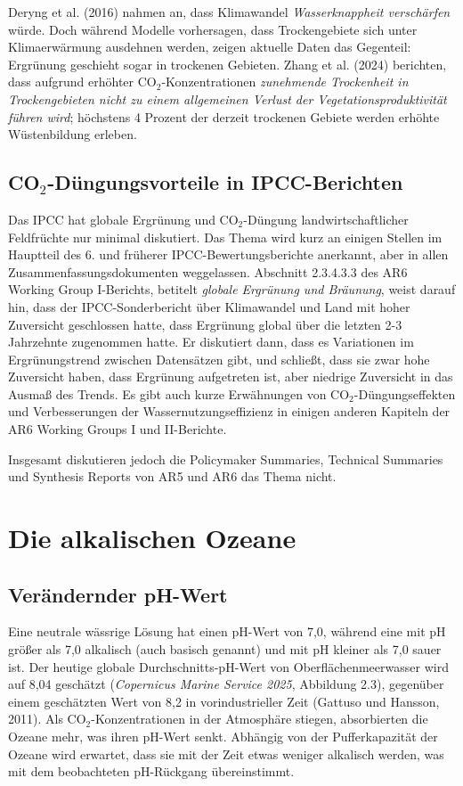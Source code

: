 \documentclass[12pt,paper=a4,DIV=12,parskip=never,chapterprefix=false,headings=standardclasses]{scrreprt}
\begin{document}
Deryng et al. (2016) nahmen an, dass Klimawandel \emph{Wasserknappheit verschärfen} würde. Doch während Modelle vorhersagen, dass Trockengebiete sich unter Klimaerwärmung ausdehnen werden, zeigen aktuelle Daten das Gegenteil: Ergrünung geschieht sogar in trockenen Gebieten. Zhang et al. (2024) berichten, dass aufgrund erhöhter CO$_2$-Konzentrationen \emph{zunehmende Trockenheit in Trockengebieten nicht zu einem allgemeinen Verlust der Vegetationsproduktivität führen wird}; höchstens 4 Prozent der derzeit trockenen Gebiete werden erhöhte Wüstenbildung erleben.

\subsection{CO$_2$-Düngungsvorteile in IPCC-Berichten}

Das IPCC hat globale Ergrünung und CO$_2$-Düngung landwirtschaftlicher Feldfrüchte nur minimal diskutiert. Das Thema wird kurz an einigen Stellen im Hauptteil des 6. und früherer IPCC-Bewertungsberichte anerkannt, aber in allen Zusammenfassungsdokumenten weggelassen. Abschnitt 2.3.4.3.3 des AR6 Working Group I-Berichts, betitelt \emph{globale Ergrünung und Bräunung}, weist darauf hin, dass der IPCC-Sonderbericht über Klimawandel und Land mit hoher Zuversicht geschlossen hatte, dass Ergrünung global über die letzten 2-3 Jahrzehnte zugenommen hatte. Er diskutiert dann, dass es Variationen im Ergrünungstrend zwischen Datensätzen gibt, und schließt, dass sie zwar hohe Zuversicht haben, dass Ergrünung aufgetreten ist, aber niedrige Zuversicht in das Ausmaß des Trends. Es gibt auch kurze Erwähnungen von CO$_2$-Düngungseffekten und Verbesserungen der Wassernutzungseffizienz in einigen anderen Kapiteln der AR6 Working Groups I und II-Berichte.

Insgesamt diskutieren jedoch die Policymaker Summaries, Technical Summaries und Synthesis Reports von AR5 und AR6 das Thema nicht.


\section{Die alkalischen Ozeane}

\subsection{Verändernder pH-Wert}

Eine neutrale wässrige Lösung hat einen pH-Wert von 7,0, während eine mit pH größer als 7,0 alkalisch (auch basisch genannt) und mit pH kleiner als 7,0 sauer ist. Der heutige globale Durchschnitts-pH-Wert von Oberflächenmeerwasser wird auf 8,04 geschätzt (\emph{Copernicus Marine Service 2025}, Abbildung 2.3), gegenüber einem geschätzten Wert von 8,2 in vorindustrieller Zeit (Gattuso und Hansson, 2011). Als CO$_2$-Konzentrationen in der Atmosphäre stiegen, absorbierten die Ozeane mehr, was ihren pH-Wert senkt. Abhängig von der Pufferkapazität der Ozeane wird erwartet, dass sie mit der Zeit etwas weniger alkalisch werden, was mit dem beobachteten pH-Rückgang übereinstimmt.
\end{document}
